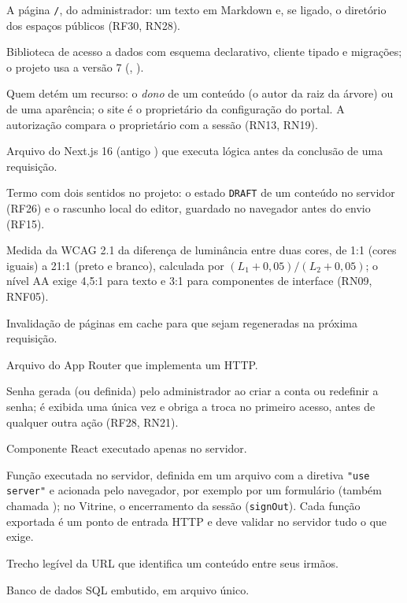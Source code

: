 \begin{description}[style=nextline, leftmargin=0.6cm, itemsep=4pt]
  \item[Portal] A página \texttt{/}, do administrador: um texto em Markdown e, se ligado, o diretório dos espaços públicos (RF30, RN28).
  \item[Prisma] Biblioteca de acesso a dados com esquema declarativo, cliente tipado e migrações; o projeto usa a versão 7 (, ).
  \item[Proprietário] Quem detém um recurso: o \emph{dono} de um conteúdo (o autor da raiz da árvore) ou de uma aparência; o site é o proprietário da configuração do portal. A autorização compara o proprietário com a sessão (RN13, RN19).
  \item[Proxy] Arquivo do Next.js 16 (antigo ) que executa lógica antes da conclusão de uma requisição.
  \item[Rascunho] Termo com dois sentidos no projeto: o estado \texttt{DRAFT} de um conteúdo no servidor (RF26) e o rascunho local do editor, guardado no navegador antes do envio (RF15).
  \item[Razão de contraste] Medida da WCAG 2.1 da diferença de luminância entre duas cores, de 1:1 (cores iguais) a 21:1 (preto e branco), calculada por $(L_1 + 0{,}05)/(L_2 + 0{,}05)$; o nível AA exige 4,5:1 para texto e 3:1 para componentes de interface (RN09, RNF05).
  \item[Revalidação] Invalidação de páginas em cache para que sejam regeneradas na próxima requisição.
  \item[Route Handler] Arquivo  do App Router que implementa um  HTTP.
  \item[Senha provisória] Senha gerada (ou definida) pelo administrador ao criar a conta ou redefinir a senha; é exibida uma única vez e obriga a troca no primeiro acesso, antes de qualquer outra ação (RF28, RN21).
  \item[Server Component] Componente React executado apenas no servidor.
  \item[Server Function] Função executada no servidor, definida em um arquivo com a diretiva \texttt{"use server"} e acionada pelo navegador, por exemplo por um formulário (também chamada ); no Vitrine, o encerramento da sessão (\texttt{signOut}). Cada função exportada é um ponto de entrada HTTP e deve validar no servidor tudo o que exige.
  \item[Slug] Trecho legível da URL que identifica um conteúdo entre seus irmãos.
  \item[SQLite] Banco de dados SQL embutido, em arquivo único.

\end{description}
